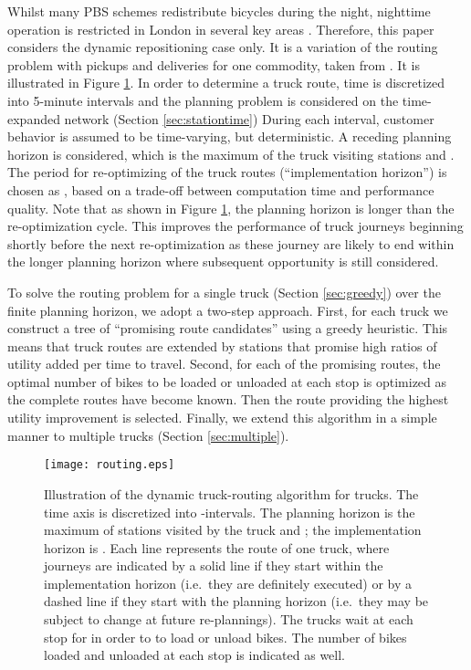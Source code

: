 \documentclass{article}
\begin{document}
Whilst many PBS schemes redistribute bicycles during the night, nighttime
operation is restricted in London in several key areas
\cite{redistribution_2012}. Therefore, this paper considers the dynamic
repositioning case only. It is a variation of the routing problem with pickups
and deliveries for one commodity, taken from \cite{berbeglia2010dynamic}. It is
illustrated in Figure \ref{fig:truckroute}. In order to determine a truck route,
time is discretized into 5-minute intervals and the planning problem is
considered on the time-expanded network (Section \ref{sec:stationtime}) During
each interval, customer behavior is assumed to be time-varying, but
deterministic. A receding planning horizon is considered, which is the maximum
of the truck visiting  stations and . The period for
re-optimizing of the truck routes (``implementation horizon'') is chosen as
, based on a trade-off between computation time and performance
quality. Note that as shown in Figure \ref{fig:truckroute}, the planning horizon
is longer than the re-optimization cycle. This improves the performance of truck
journeys beginning shortly before the next re-optimization as these journey are
likely to end within the longer planning horizon where subsequent opportunity is
still considered.

To solve the routing problem for a single truck (Section \ref{sec:greedy}) over
the finite planning horizon, we adopt a two-step approach. First, for each truck
we construct a tree of ``promising route candidates'' using a greedy heuristic.
This means that truck routes are extended by stations that promise high ratios
of utility added per time to travel. Second, for each of the promising routes,
the optimal number of bikes to be loaded or unloaded at each stop is optimized
as the complete routes have become known. Then the route providing the highest
utility improvement is selected. Finally, we extend this algorithm in a simple
manner to multiple trucks (Section \ref{sec:multiple}).

\begin{figure}[t]
    \centering
    \texttt{[image: routing.eps]}
    \caption{Illustration of the dynamic truck-routing algorithm for 
      trucks. The time axis is discretized into -intervals. The
      planning horizon is the maximum of  stations visited by the
      truck and ; the implementation horizon is
      . Each line represents the route of one
      truck, where journeys are indicated by a solid line if they start within
      the implementation horizon (i.e.\ they are definitely executed) or by a
      dashed line if they start with the planning horizon (i.e.\ they may be
      subject to change at future re-plannings). The trucks wait at each stop
      for  in order to to load or unload bikes. The number of
      bikes loaded and unloaded at each stop is indicated as well.
      \label{fig:truckroute}}
\end{figure}
\end{document}
